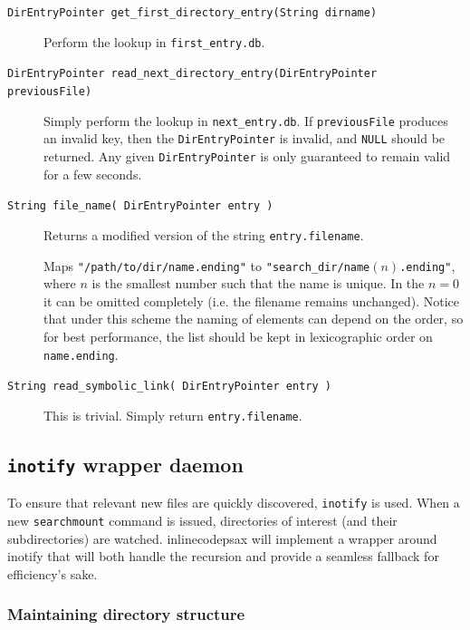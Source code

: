 \documentclass[a4paper]{report}
\newcommand{\inlinecode}{\texttt}
\begin{document}
\begin{description}
\item[\inlinecode{DirEntryPointer get\_first\_directory\_entry(String dirname)}]

Perform the lookup in \inlinecode{first\_entry.db}.

\item[\inlinecode{DirEntryPointer read\_next\_directory\_entry(DirEntryPointer previousFile)}]

Simply perform the lookup in \inlinecode{next\_entry.db}. If \inlinecode{previousFile} produces an invalid key, then the \inlinecode{DirEntryPointer} is invalid, and \inlinecode{NULL} should be returned. Any given \inlinecode{DirEntryPointer} is only guaranteed to remain valid for a few seconds.

\item[\inlinecode{String file\_name( DirEntryPointer entry )}]

Returns a modified version of the string \inlinecode{entry.filename}.

Maps \inlinecode{"/path/to/dir/name.ending"} to \inlinecode{"search\_dir/name$(n)$.ending"}, where $n$ is the smallest number such that the name is unique. In the $n=0$ it can be omitted completely (i.e. the filename remains unchanged). Notice that under this scheme the naming of elements can depend on the order, so for best performance, the list should be kept in lexicographic order on \inlinecode{name.ending}.

\item[\inlinecode{String read\_symbolic\_link( DirEntryPointer entry )}]

This is trivial. Simply return \inlinecode{entry.filename}.

\end{description}

\subsection{\inlinecode{inotify} wrapper daemon}

To ensure that relevant new files are quickly discovered, \inlinecode{inotify} is used. When a new \inlinecode{searchmount} command is issued, directories of interest (and their subdirectories) are watched. inlinecode{psax} will implement a wrapper around inotify that will both handle the recursion and provide a seamless fallback for efficiency's sake.

\subsubsection{Maintaining directory structure}
\end{document}
